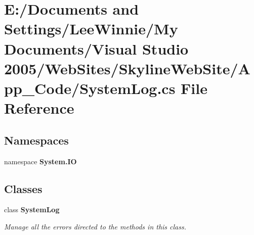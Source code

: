 \section{E:/Documents and Settings/Lee\-Winnie/My Documents/Visual Studio 2005/Web\-Sites/Skyline\-Web\-Site/App\_\-Code/System\-Log.cs File Reference}
\label{_system_log_8cs}
\subsection*{Namespaces}
\begin{CompactItemize}
\item 
namespace {\bf System.IO}
\end{CompactItemize}
\subsection*{Classes}
\begin{CompactItemize}
\item 
class {\bf System\-Log}
\begin{CompactList}\small\item\em Manage all the errors directed to the methods in this class. \item\end{CompactList}\end{CompactItemize}
